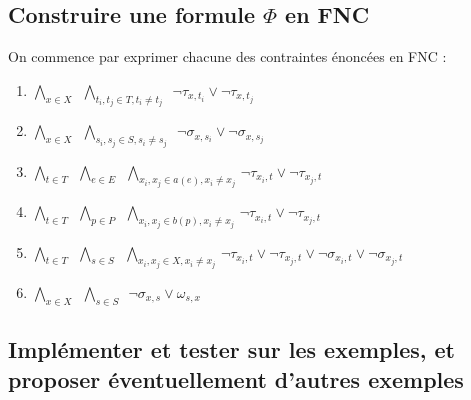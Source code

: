 \documentclass[a4paper]{article}
\begin{document}
\subsection{Construire une formule $\Phi$ en FNC}
On commence par exprimer chacune des contraintes énoncées en FNC :

\begin{enumerate}
  \item $ \bigwedge\limits_{x \in X} \,\,\,
          \bigwedge\limits_{t_i, t_j \in T, t_i \neq t_j} \,\,\,
          \lnot \tau_{x,t_i} \lor \lnot \tau_{x,t_j}$
  \item $ \bigwedge\limits_{x \in X} \,\,\,
          \bigwedge\limits_{s_i, s_j \in S, s_i \neq s_j} \,\,\,
          \lnot \sigma_{x,s_i} \lor \lnot \sigma_{x,s_j}$
  \item $ \bigwedge\limits_{t \in T} \,\,\,
          \bigwedge\limits_{e \in E} \,\,\,
          \bigwedge\limits_{x_i, x_j \in a(e), x_i \neq x_j} \,
          \lnot \tau_{x_i,t} \lor \lnot \tau_{x_j,t}$
  \item $ \bigwedge\limits_{t \in T} \,\,\,
          \bigwedge\limits_{p \in P} \,\,\,
          \bigwedge\limits_{x_i, x_j \in b(p), x_i \neq x_j} \,
          \lnot \tau_{x_i,t} \lor \lnot \tau_{x_j,t}$
  \item $ \bigwedge\limits_{t \in T} \,\,\,
          \bigwedge\limits_{s \in S} \,\,\,
          \bigwedge\limits_{x_i, x_j \in X, x_i \neq x_j} \,
          \lnot \tau_{x_i,t} \lor \lnot \tau_{x_j,t} \lor \lnot \sigma_{x_i,t} \lor \lnot \sigma_{x_j,t}$
  \item $ \bigwedge\limits_{x \in X} \,\,\,
          \bigwedge\limits_{s \in S} \,\,\,
          \lnot \sigma_{x,s} \lor \omega_{s,x}$
\end{enumerate}

\subsection{Implémenter et tester sur les exemples, et proposer éventuellement d’autres exemples}
\end{document}
